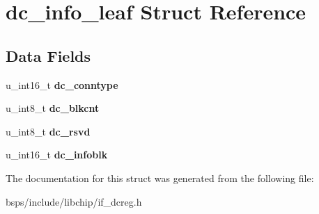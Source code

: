 \hypertarget{structdc__info__leaf}{}\section{dc\+\_\+info\+\_\+leaf Struct Reference}
\label{structdc__info__leaf}
\subsection*{Data Fields}
\begin{DoxyCompactItemize}
\item 
\mbox{\label{structdc__info__leaf_ad57793a0e1027f84056d3068e84ad133}} 
u\+\_\+int16\+\_\+t {\bfseries dc\+\_\+conntype}
\item 
\mbox{\label{structdc__info__leaf_a022190bb6c57389aa4c21e7b7bcd85bf}} 
u\+\_\+int8\+\_\+t {\bfseries dc\+\_\+blkcnt}
\item 
\mbox{\label{structdc__info__leaf_ab74bc1049621997b4571b34aa0ea4716}} 
u\+\_\+int8\+\_\+t {\bfseries dc\+\_\+rsvd}
\item 
\mbox{\label{structdc__info__leaf_a5683feba8f98bacd978929298838b42c}} 
u\+\_\+int16\+\_\+t {\bfseries dc\+\_\+infoblk}
\end{DoxyCompactItemize}


The documentation for this struct was generated from the following file\+:\begin{DoxyCompactItemize}
\item 
bsps/include/libchip/if\+\_\+dcreg.\+h\end{DoxyCompactItemize}
